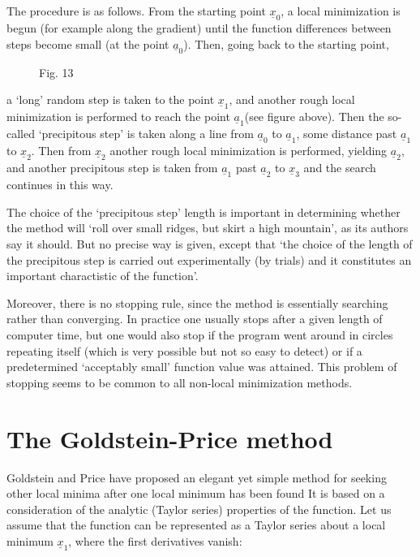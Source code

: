       The procedure is as follows. From the starting point ${\underline{x}}_0$, a local
minimization is begun (for example along the gradient) until the function
differences between steps become small (at the point ${\underline{a}}_0$). Then,
 going back to the starting point,
\begin{figure}
\begin{center}\mbox{}\end{center}
 
\begin{center}
Fig. 13
\end{center}
\end{figure}
 a `long' random step is taken to the
point ${\underline{x}}_1$, and another rough local minimization is performed to reach the
point ${\underline{a}}_1$(see figure above). Then the so-called `precipitous step' is
taken along a line from ${\underline{a}}_0$ to ${\underline{a}}_1$, some distance past
 ${\underline{a}}_1$ to ${\underline{x}}_2$.
Then from ${\underline{x}}_2$ another rough local
minimization is performed, yielding ${\underline{a}}_2$, and another
precipitous step is taken from ${\underline{a}}_1$ past ${\underline{a}}_2$ to ${\underline{x}}_3$ 
and the search continues in this way.
 
 
      The choice of the `precipitous step' length is important in determining whether the method
will `roll over small ridges, but skirt a high mountain', as its authors say it should. But no
precise way is given, except that `the choice of the length of the precipitous step is carried
out experimentally (by trials) and it constitutes an important
charactistic of the function'.
 
     Moreover, there is no stopping rule, since the method is essentially
searching rather than converging.  In practice one usually stops after
a given length of computer time, but one would also stop if the program
went around in circles repeating itself (which is very possible but not
so easy to detect) or if a predetermined `acceptably small' function
value was attained.  This problem of stopping seems to be common to all
non-local minimization methods.
 
\section{The Goldstein-Price method}
 
     Goldstein and Price \cite{Gold1} have proposed an elegant yet simple method
for seeking other local minima after one local minimum has been found
It is based on a consideration of the analytic (Taylor series) properties
of the function.  Let us assume that the function can be represented as
a Taylor series about a local minimum ${\underline{x}}_1$, where the first derivatives
vanish:
 
